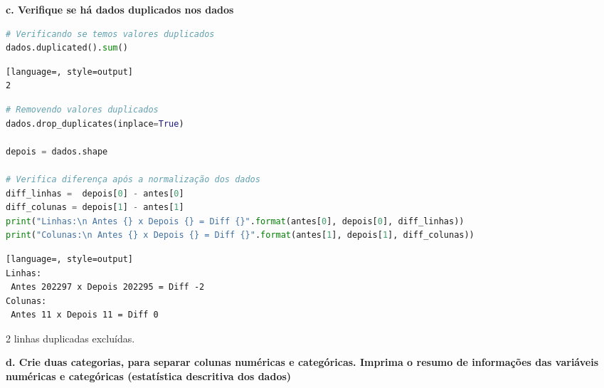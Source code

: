 \begin{adjustwidth}{1em}{}
\textbf{c. Verifique se há dados duplicados nos dados}
\end{adjustwidth}


\begin{lstlisting}[language=Python, style=input]
# Verificando se temos valores duplicados
dados.duplicated().sum() 
\end{lstlisting}
\begin{lstlisting}[language=, style=output]
2
\end{lstlisting}

\begin{lstlisting}[language=Python, style=input]
# Removendo valores duplicados
dados.drop_duplicates(inplace=True)

depois = dados.shape

# Verifica diferença após a normalização dos dados
diff_linhas =  depois[0] - antes[0]
diff_colunas = depois[1] - antes[1]
print("Linhas:\n Antes {} x Depois {} = Diff {}".format(antes[0], depois[0], diff_linhas))
print("Colunas:\n Antes {} x Depois {} = Diff {}".format(antes[1], depois[1], diff_colunas))
\end{lstlisting}
\begin{lstlisting}[language=, style=output]
Linhas:
 Antes 202297 x Depois 202295 = Diff -2
Colunas:
 Antes 11 x Depois 11 = Diff 0
\end{lstlisting}

2 linhas duplicadas excluídas.

\begin{adjustwidth}{1em}{}
\textbf{d. Crie duas categorias, para separar colunas numéricas e categóricas. Imprima o resumo de informações das variáveis numéricas e categóricas (estatística descritiva dos dados)}
\end{adjustwidth}

